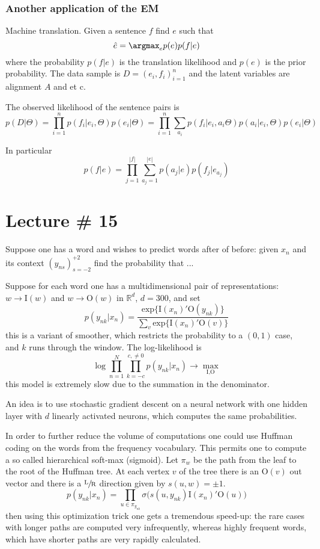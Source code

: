 \documentclass[a4paper]{article}
\newcommand{\Real}{\mathbb{R}}
\begin{document}

\subsubsection{Another application of the EM} %
\label{ssub:another_application_of_the_em}

Machine translation. Given a sentence $f$ find $e$ such that
\[ \hat{e} = \argmax_e p(e) p(f|e)\]
where the probability $p(f|e)$ is the translation likelihood and $p(e)$ is the 
prior probability. The data sample is $D = (e_i,f_i)_{i=1}^n$ and the latent variables
are alignment $A$ and et c.

The observed likelihood of the sentence pairs is
\[
p(D|\Theta)
= \prod_{i=1}^n p(f_i|e_i,\Theta) p(e_i|\Theta)
= \prod_{i=1}^n \sum_{a_i} p(f_i|e_i,a_i\Theta) p(a_i|e_i,\Theta) p(e_i|\Theta)
\]

In particular
\[
p(f|e) = \prod_{j=1}^{|f|} \sum_{a_j=1}^{|e|} p(a_j|e) p(f_j|e_{a_j})
\]


\section{Lecture \# 15} %
\label{sec:lecture_15}

Suppose one has a word and wishes to predict words after of before: given $x_n$
and its context $(y_{ns})_{s=-2}^{+2}$ find the probability that ...


Suppose for each word one has a multidimensional pair of representations:
$w\to \text{I}(w)$ and $w\to \text{O}(w)$ in $\Real^d$, $d = 300$, and set
\[
p(y_{nk} | x_n)
= \frac{ \text{exp}\{ \text{I}(x_n)'\text{O}(y_{nk}) \} }{\sum_v \text{exp}\{ \text{I}(x_n)'\text{O}(v) \}}
\]
this is a variant of smoother, which restricts the probability to a $(0,1)$ case,
and $k$ runs through the window. The log-likelihood is
\[
\log \prod_{n=1}^N \prod_{k=-c}^{c,\neq 0} p(y_{nk} | x_n) \to \max_{\text{I},\text{O}}
\]
this model is extremely slow due to the summation in the denominator.

An idea is to use stochastic gradient descent on a neural network with one hidden
layer with $d$ linearly activated neurons, which computes the same probabilities.

In order to further reduce the volume of computations one could use Huffman coding
on the words from the frequency vocabulary. This permits one to compute a so called
hierarchical soft-max (sigmoid). Let $\pi_w$ be the path from the leaf to the root
of the Huffman tree. At each vertex $v$ of the tree there is an $\text{O}(v)$ out
vector and there is a $\sfrac{\text{L}}{\text{R}}$ direction given by $s(u,w)=\pm1$.
\[
p(y_{nk} | x_n)
= \prod_{u\in\pi_{y_{nk}}} \sigma\bigl( s(u,y_{nk}) \text{I}(x_n)'\text{O}(u)\bigr)
\]
then using this optimization trick one gets a tremendous speed-up: the rare cases
with longer paths are computed very infrequently, whereas highly frequent words,
which have shorter paths are very rapidly calculated.

\end{document}
